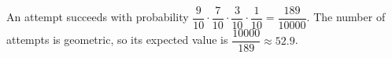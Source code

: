 An attempt succeeds with probability $\dfrac9{10}\cdot\dfrac7{10}\cdot\dfrac3{10}\cdot\dfrac1{10}=\dfrac{189}{10000}$. The number of attempts is geometric, so its expected value is $\boxed{\dfrac{10000}{189}}\approx52.9$.
